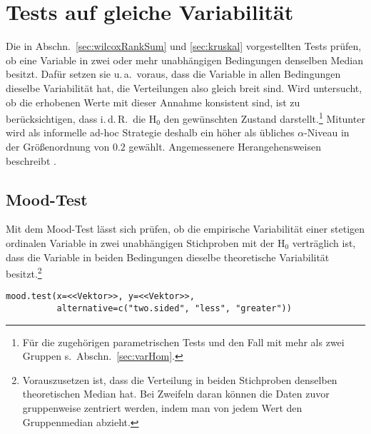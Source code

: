 \section{Tests auf gleiche Variabilität}
\label{sec:dispHom}

Die in Abschn.\ \ref{sec:wilcoxRankSum} und \ref{sec:kruskal} vorgestellten Tests prüfen, ob eine Variable in zwei oder mehr unabhängigen Bedingungen denselben Median besitzt. Dafür setzen sie u.\,a.\ voraus, dass die Variable in allen Bedingungen dieselbe Variabilität hat, die Verteilungen also gleich breit sind. Wird untersucht, ob die erhobenen Werte mit dieser Annahme konsistent sind, ist zu berücksichtigen, dass i.\,d.\,R.\ die $\text{H}_{0}$ den gewünschten Zustand darstellt.\footnote{Für die zugehörigen parametrischen Tests und den Fall mit mehr als zwei Gruppen s.\ Abschn.\ \ref{sec:varHom}.} Mitunter wird als informelle ad-hoc Strategie deshalb ein höher als übliches $\alpha$-Niveau in der Größenordnung von $0.2$ gewählt. Angemessenere Herangehensweisen beschreibt .

\subsection{Mood-Test}
\label{sec:mood}

Mit dem Mood-Test lässt sich prüfen, ob die empirische Variabilität einer stetigen ordinalen Variable in zwei unabhängigen Stichproben mit der $\text{H}_{0}$ verträglich ist, dass die Variable in beiden Bedingungen dieselbe theoretische Variabilität besitzt.\footnote{\label{ftn:mood}Vorauszusetzen ist, dass die Verteilung in beiden Stichproben denselben theoretischen Median hat. Bei Zweifeln daran können die Daten zuvor gruppenweise zentriert werden, indem man von jedem Wert den Gruppenmedian abzieht.}
\begin{lstlisting}
mood.test(x=<<Vektor>>, y=<<Vektor>>,
          alternative=c("two.sided", "less", "greater"))
\end{lstlisting}

